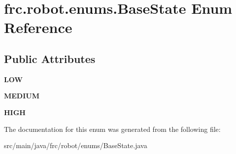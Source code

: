 \hypertarget{enumfrc_1_1robot_1_1enums_1_1_base_state}{}\section{frc.\+robot.\+enums.\+Base\+State Enum Reference}
\label{enumfrc_1_1robot_1_1enums_1_1_base_state}
\subsection*{Public Attributes}
\begin{DoxyCompactItemize}
\item 
\mbox{\label{enumfrc_1_1robot_1_1enums_1_1_base_state_a8504d328dd02b36aff5686edd2d13012}} 
{\bfseries L\+OW}
\item 
\mbox{\label{enumfrc_1_1robot_1_1enums_1_1_base_state_a57ad979a96db07902c32ad81842e67dd}} 
{\bfseries M\+E\+D\+I\+UM}
\item 
\mbox{\label{enumfrc_1_1robot_1_1enums_1_1_base_state_ab08e9e6dc7b4fd962e0a19870e9d2eea}} 
{\bfseries H\+I\+GH}
\end{DoxyCompactItemize}


The documentation for this enum was generated from the following file\+:\begin{DoxyCompactItemize}
\item 
src/main/java/frc/robot/enums/Base\+State.\+java\end{DoxyCompactItemize}
